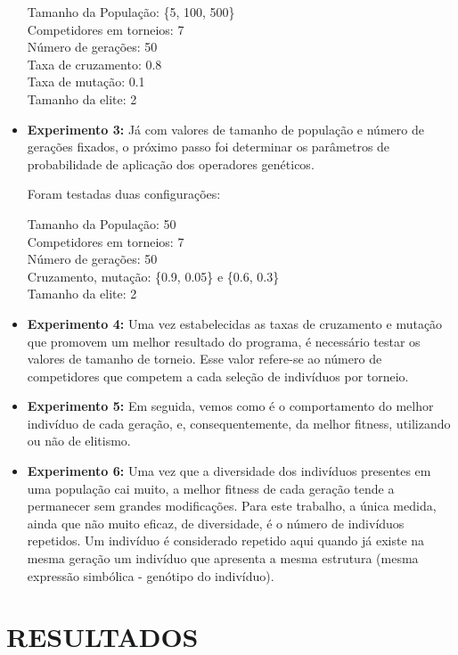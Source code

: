 \documentclass[12pt]{article}
\begin{document}
\begin{itemize}
 Tamanho da População: \{5, 100, 500\} \\
 Competidores em torneios: 7 \\
 Número de gerações: 50 \\
 Taxa de cruzamento: 0.8 \\
 Taxa de mutação: 0.1 \\
 Tamanho da elite: 2 \\
 
 \item \textbf{Experimento 3:} Já com valores de tamanho de população e número de gerações fixados,
 o próximo passo foi determinar os parâmetros de probabilidade de aplicação dos operadores genéticos.
 
 Foram testadas duas configurações:
 
 Tamanho da População: 50 \\
 Competidores em torneios: 7 \\
 Número de gerações: 50 \\
 Cruzamento, mutação: \{0.9, 0.05\} e \{0.6, 0.3\} \\
 Tamanho da elite: 2 \\
 
 \item \textbf{Experimento 4:} Uma vez estabelecidas as taxas de cruzamento e mutação que promovem
 um melhor resultado do programa, é necessário testar os valores de tamanho de torneio. Esse valor
 refere-se ao número de competidores que competem a cada seleção de indivíduos por torneio.
 
 \item \textbf{Experimento 5:} Em seguida, vemos como é o comportamento do melhor indivíduo de
 cada geração, e, consequentemente, da melhor fitness, utilizando ou não de elitismo.
 
 \item \textbf{Experimento 6:} Uma vez que a diversidade dos indivíduos presentes em uma população
 cai muito, a melhor fitness de cada geração tende a permanecer sem grandes modificações. Para este
 trabalho, a única medida, ainda que não muito eficaz, de diversidade, é o número de indivíduos
 repetidos. Um indivíduo é considerado repetido aqui quando já existe na mesma geração um indivíduo
 que apresenta a mesma estrutura (mesma expressão simbólica - genótipo do indivíduo).
 
\end{itemize}


\section{RESULTADOS} \label{sec:result}
\end{document}

